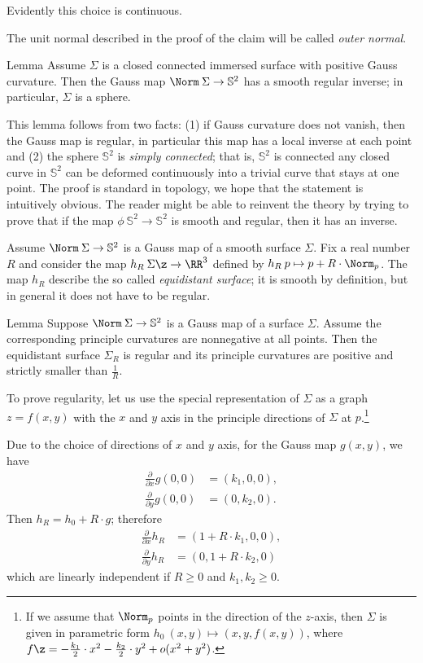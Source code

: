 Evidently this choice is  continuous.
\qeds

The unit normal described in the proof of the claim will be called \emph{outer normal}.

\begin{thm}{Lemma}\label{lem:gauss-inverse}
Assume $\Sigma$ is a closed connected immersed surface with positive Gauss curvature.
Then the Gauss map $\Norm\:\Sigma \to \mathbb{S}^2$ has a smooth regular inverse;
in particular, $\Sigma$ is a sphere.
\end{thm}

This lemma follows from two facts:
(1) if Gauss curvature does not vanish, then the  Gauss map is regular, in particular this map has a local inverse at each point
and
(2) the sphere $\mathbb{S}^2$ is \emph{simply connected};
that is, $\mathbb{S}^2$ is connected any closed curve in $\mathbb{S}^2$ can be deformed continuously into a trivial curve that stays at one point.
The proof is standard in topology, we hope that the statement is intuitively obvious.
The reader might be able to reinvent the theory by trying to prove that if the map $\phi\:\mathbb{S}^2\to\mathbb{S}^2$ is smooth and regular, then it has an inverse.

Assume $\Norm\:\Sigma\to \mathbb{S}^2$ is a Gauss map of a smooth surface $\Sigma$.
Fix a real number $R$ and consider the map $h_R\:\Sigma\z\to\RR^3$ defined by $h_R\:p\mapsto p+R\cdot\Norm_p$.
The map $h_R$ describe the so called \emph{equidistant surface};
it is smooth by definition, but in general it does not have to be regular.

\begin{thm}{Lemma}\label{lem:curc<1/R}
Suppose $\Norm\:\Sigma\to \mathbb{S}^2$ is a Gauss map of a surface $\Sigma$.
Assume the corresponding principle curvatures are nonnegative at all points. 
Then the equidistant surface $\Sigma_R$ is regular and its principle curvatures are positive and strictly smaller than $\tfrac1R$.
\end{thm}

To prove regularity, let us use the special representation of $\Sigma$ as a graph $z=f(x,y)$ with the $x$ and $y$ axis in the principle directions of $\Sigma$ at $p$.\footnote{If we assume that $\Norm_p$ points in the direction of the $z$-axis, then $\Sigma$ is given in parametric form 
$h_0\:(x,y)\mapsto (x,y,f(x,y))$,
where $f\z=-\tfrac{k_1}2\cdot x^2-\tfrac{k_2}2\cdot y^2+o(x^2+y^2)$.}

Due to the choice of directions of $x$ and $y$ axis,
for the Gauss map $g(x,y)$, we have 
\begin{align*}
\tfrac{\partial}{\partial x}g(0,0)&=(k_1,0,0),
\\
\tfrac{\partial}{\partial y}g(0,0)&=(0,k_2,0).
\end{align*}
Then $h_R=h_0+R\cdot g$; therefore
\begin{align*}
\tfrac{\partial}{\partial x} h_R&=(1+R\cdot k_1,0,0),
\\
\tfrac{\partial}{\partial y} h_R&=(0,1+R\cdot k_2,0)
\end{align*}
which are linearly independent if $R\ge0$ and $k_1,k_2\ge 0$. 

